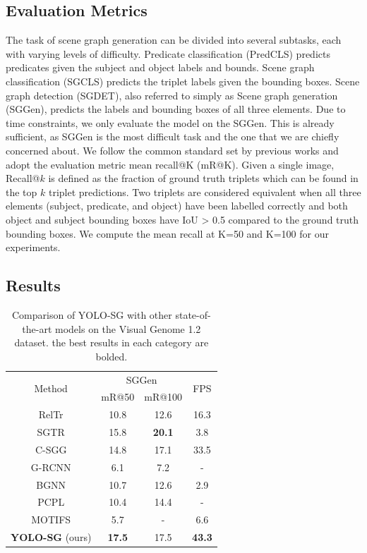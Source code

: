 \documentclass{article}
\begin{document}
\subsection{Evaluation Metrics}
The task of scene graph generation can be divided into several subtasks, each with varying levels of difficulty. Predicate classification (PredCLS)\cite{cong2023reltr,jin2023fast,dornadula2019visual} predicts predicates given the subject and object labels and bounds. Scene graph classification (SGCLS)\cite{cong2023reltr,dornadula2019visual} predicts the triplet labels given the bounding boxes. Scene graph detection (SGDET)\cite{cong2023reltr}, also referred to simply as Scene graph generation (SGGen)\cite{jin2023fast,dornadula2019visual}, predicts the labels and bounding boxes of all three elements.
Due to time constraints, we only evaluate the model on the SGGen. This is already sufficient, as SGGen is the most difficult task and the one that we are chiefly concerned about. We follow the common standard set by previous works\cite{cong2023reltr, yang2018graph, li2022sgtr, jin2023fast, yan2020pcpl} and adopt the evaluation metric mean recall@K (mR@K). Given a single image, Recall@$k$ is defined as the fraction of ground truth triplets which can be found in the top $k$ triplet predictions. Two triplets are considered equivalent when all three elements (subject, predicate, and object) have been labelled correctly and both object and subject bounding boxes have IoU > 0.5 compared to the ground truth bounding boxes. We compute the mean recall at K=50 and K=100 for our experiments. 

\subsection{Results}
\begin{table}[]
\caption{Comparison of YOLO-SG with other state-of-the-art models on the Visual Genome 1.2 dataset. the best results in each category are bolded.}
    \centering
\begin{tabular}{cccc}
\hline
\multirow{2}{*}{Method} & \multicolumn{2}{c|}{SGGen} & \multirow{2}{*}{FPS}  \\
                        & mR@50       & mR@100       &      \\ \hline
RelTr                   & 10.8        & 12.6         & 16.3 \\
SGTR                    & 15.8        & \textbf{20.1}         & 3.8  \\
C-SGG                   & 14.8        & 17.1         & 33.5 \\
G-RCNN                  & 6.1        & 7.2         & -    \\
BGNN                    & 10.7        & 12.6         & 2.9 \\
PCPL                    & 10.4        & 14.4         & -    \\
MOTIFS                  & 5.7         & -            & 6.6  \\ \hline
\textbf{YOLO-SG} (ours)                 & \textbf{17.5}        & 17.5            & \textbf{43.3} \\ \hline
\end{tabular}
\end{table}
\end{document}
